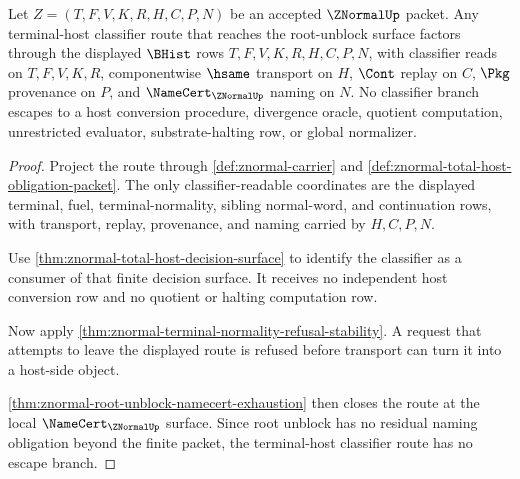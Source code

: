 \begin{theorem}
\label{thm:znormal-terminal-host-classifier-route-nonescape}
Let $Z=(T,F,V,K,R,H,C,P,N)$ be an accepted $\ZNormalUp$ packet. Any terminal-host classifier route that reaches the root-unblock surface factors through the displayed $\BHist$ rows $T,F,V,K,R,H,C,P,N$, with classifier reads on $T,F,V,K,R$, componentwise $\hsame$ transport on $H$, $\Cont$ replay on $C$, $\Pkg$ provenance on $P$, and $\NameCert_{\ZNormalUp}$ naming on $N$. No classifier branch escapes to a host conversion procedure, divergence oracle, quotient computation, unrestricted evaluator, substrate-halting row, or global normalizer.
\end{theorem}
\begin{proof}
Project the route through \autoref{def:znormal-carrier} and \autoref{def:znormal-total-host-obligation-packet}. The only classifier-readable coordinates are the displayed terminal, fuel, terminal-normality, sibling normal-word, and continuation rows, with transport, replay, provenance, and naming carried by $H,C,P,N$.

Use \autoref{thm:znormal-total-host-decision-surface} to identify the classifier as a consumer of that finite decision surface. It receives no independent host conversion row and no quotient or halting computation row.

Now apply \autoref{thm:znormal-terminal-normality-refusal-stability}. A request that attempts to leave the displayed route is refused before transport can turn it into a host-side object.

\autoref{thm:znormal-root-unblock-namecert-exhaustion} then closes the route at the local $\NameCert_{\ZNormalUp}$ surface. Since root unblock has no residual naming obligation beyond the finite packet, the terminal-host classifier route has no escape branch.
\end{proof}

